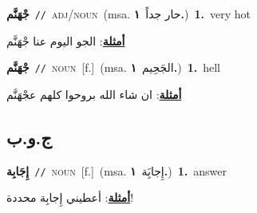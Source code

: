 \documentclass[10pt,a4paper,twoside]{article} %
\begin{document}
\begin{multicols}{2}
{\setlength\topsep{0pt}\textbf{\foreignlanguage{arabic}{جْهَنَّم}}\ {\color{gray}\texttt{//}\color{black}}\ \textsc{adj/noun}\ \color{gray}(msa. \foreignlanguage{arabic}{حار جداً}~\foreignlanguage{arabic}{\textbf{١.}})\color{black}\ \textbf{1.}~very hot\  \begin{flushright}\color{gray}\foreignlanguage{arabic}{\textbf{\underline{\foreignlanguage{arabic}{أمثلة}}}: الجو اليوم عنا جْهَنَّم}\end{flushright}\color{black}} \vspace{2mm}

{\setlength\topsep{0pt}\textbf{\foreignlanguage{arabic}{جْهَنَّم}}\ {\color{gray}\texttt{//}\color{black}}\ \textsc{noun}\ [f.]\ \color{gray}(msa. \foreignlanguage{arabic}{الجَحِيم}~\foreignlanguage{arabic}{\textbf{١.}})\color{black}\ \textbf{1.}~hell\  \begin{flushright}\color{gray}\foreignlanguage{arabic}{\textbf{\underline{\foreignlanguage{arabic}{أمثلة}}}: ان شاء الله بروحوا كلهم عجْهَنَّم}\end{flushright}\color{black}} \vspace{2mm}

\vspace{-3mm}
\subsection*{\color{blue}\foreignlanguage{arabic}{ج.و.ب}\color{blue}{}} 

{\setlength\topsep{0pt}\textbf{\foreignlanguage{arabic}{إِجَابِة}}\ {\color{gray}\texttt{//}\color{black}}\ \textsc{noun}\ [f.]\ \color{gray}(msa. \foreignlanguage{arabic}{إِجابَِة}~\foreignlanguage{arabic}{\textbf{١.}})\color{black}\ \textbf{1.}~answer\  \begin{flushright}\color{gray}\foreignlanguage{arabic}{\textbf{\underline{\foreignlanguage{arabic}{أمثلة}}}: أعطيني إِجابِة محددة!}\end{flushright}\color{black}} \vspace{2mm}


\end{multicols}
\end{document}
